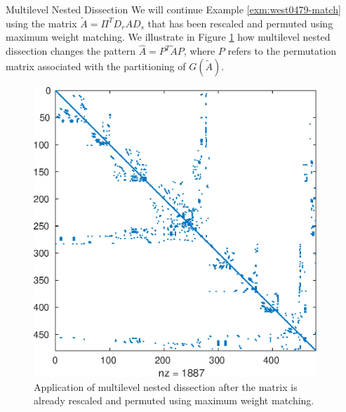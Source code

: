 \begin{example}{Multilevel Nested Dissection}\label{exm:west0479-metis}
We will continue Example \ref{exm:west0479-match} using the matrix
$\tilde A=\Pi^TD_rAD_s$ that has been rescaled and permuted using
maximum weight matching. We illustrate in Figure \ref{fig:metis} 
how multilevel nested dissection changes the pattern $\hat A=P^T \tilde A P$,
where $P$ refers to the permutation matrix associated with the partitioning
of $G(\tilde A)$.
\end{example}
\begin{figure}
\begin{minipage}{.55\textwidth}
  \begin{center}
\includegraphics[width=0.95\textwidth]{figures/west0479-match-metis} 
 \end{center}  
\end{minipage}
    \caption{Application of multilevel
nested dissection after the matrix is already rescaled and permuted using maximum weight matching.}
    \label{fig:metis}
\end{figure}

